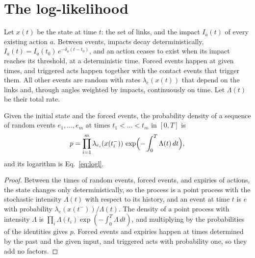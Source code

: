 \appendix

\section{The log-likelihood}\label{app:likelihood}
Let $x(t)$ be the state at time $t$: the set of links, and the impact $I_a(t)$ of every existing action $a$.
Between events, impacts decay deterministically, $I_a(t) = I_a(t_0)\,e^{-\delta_a (t - t_0)}$, and an action ceases to exist when its impact reaches its threshold, at a deterministic time.
Forced events happen at given times, and triggered acts happen together with the contact events that trigger them.
All other events are random with rates $\lambda_e(x(t))$ that depend on the links and, through angles weighted by impacts, continuously on time.
Let $\Lambda(t)$ be their total rate.

\begin{proposition}\label{prop:likelihood}
Given the initial state and the forced events, the probability density of a sequence of random events $e_1, \dots, e_m$ at times $t_1 < \dots < t_m$ in $[0, T]$ is
\begin{equation*}
  p = \prod_{i=1}^m \lambda_{e_i}(x(t_i^-)) \, \exp\Bigl(-\int_0^T \Lambda(t)\,dt\Bigr),
\end{equation*}
and its logarithm is Eq.~\eqref{eq:logl}.
\end{proposition}

\begin{proof}
Between the times of random events, forced events, and expiries of actions, the state changes only deterministically, so the process is a point process with the stochastic intensity $\Lambda(t)$ with respect to its history, and an event at time $t$ is $e$ with probability $\lambda_e(x(t^-))/\Lambda(t)$.
The density of a point process with intensity $\Lambda$ is $\prod_i \Lambda(t_i) \exp(-\int_0^T \Lambda\,dt)$, and multiplying by the probabilities of the identities gives $p$.
Forced events and expiries happen at times determined by the past and the given input, and triggered acts with probability one, so they add no factors.
\end{proof}

